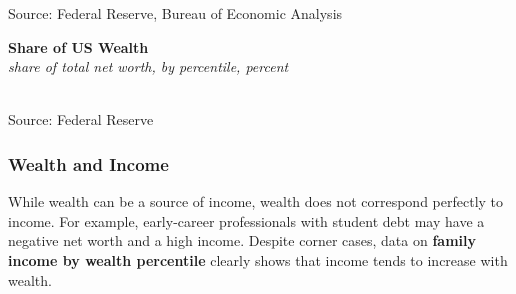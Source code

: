\documentclass{report}
\makeatletter
\newcommand{\tbllink}[1]{\href{https://raw.githubusercontent.com/bdecon/US-chartbook/master/chartbook/data/#1}{\faTable}}
\newcommand*\short[1]{\expandafter\@gobbletwo\number\numexpr#1\relax}
\newcommand{\absnode}[3]{\node[below right, align=left] at (axis cs: #1,#2) {#3};}
\newcommand{\shdateaxisticks}{
		date coordinates in=x, axis line style={draw=none},
		xmax={2024-01-31},
		max space between ticks=40,	    
		xtick={{1990-01-01}, {1995-01-01}, {2000-01-01}, 
			{2005-01-01}, {2010-01-01}, {2015-01-01}, {2020-01-01}},
		minor xtick={},
		enlarge y limits={0.06}, enlarge x limits={0.01},
		xticklabel style={align=center, yshift=-2pt}, tick label style={inner sep=0pt},
		}
\newcommand{\bbar}[2]{extra #1 ticks = {{#2}}, extra #1 tick labels = ,
		extra #1 tick style = {grid=major, grid style={thick, black!25}},}
\newcommand{\thickline}[4]{\addplot[ultra thick, no markers, color=#1] 
		table [x=#2, y=#3, col sep=comma] {#4};	}
\newcommand{\rbars}{
		\fill[color=black!10] (axis cs:{1990-07-01},\pgfkeysvalueof{/pgfplots/ymin})
			rectangle (axis cs:{1991-03-01}, \pgfkeysvalueof{/pgfplots/ymax});
		\fill[color=black!10] (axis cs:{2007-12-01},\pgfkeysvalueof{/pgfplots/ymin})
			rectangle (axis cs:{2009-07-01}, \pgfkeysvalueof{/pgfplots/ymax});
		\fill[color=black!10] (axis cs:{2001-03-01},\pgfkeysvalueof{/pgfplots/ymin})
			rectangle (axis cs:{2001-11-01}, \pgfkeysvalueof{/pgfplots/ymax});
		\fill[color=black!10] (axis cs:{2020-02-01},\pgfkeysvalueof{/pgfplots/ymin})
			rectangle (axis cs:{2020-05-01}, \pgfkeysvalueof{/pgfplots/ymax});}
\makeatother
\begin{document}
{\begin{minipage}{1.0\textwidth}
\footnotesize{Source: Federal Reserve, Bureau of Economic Analysis} \hfill \tbllink{rdpi_nw.csv}
\end{minipage}
\newpage
\begin{minipage}{0.33\textwidth}  
\small 
\end{minipage}\hspace{6mm}
\begin{minipage}{0.39\textwidth}
\normalsize \textbf{Share of US Wealth}\\
\footnotesize{\textit{share of total net worth, by percentile, percent}}\\
\hspace*{-1mm} \\
\footnotesize{Source: Federal Reserve} \hfill \tbllink{dfa_nw_sh.csv} \ \ \ 
\end{minipage}
\vspace{3mm}

\begin{minipage}{1.0\textwidth}
\subsubsection*{Wealth and Income}
\small While wealth can be a source of income, wealth does not correspond perfectly to income. For example, early-career professionals with student debt may have a negative net worth and a high income. Despite corner cases, data on \textbf{family income by wealth percentile} clearly shows that income tends to increase with wealth. 


\end{minipage}}
\end{document}
